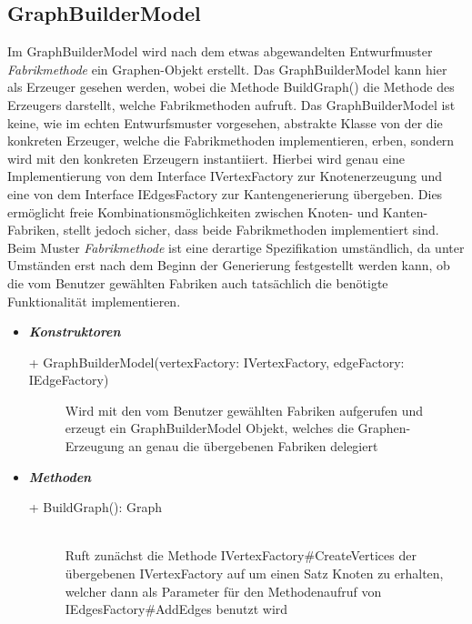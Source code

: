 \documentclass[13pt]{scrreprt}
\begin{document}
	\subsection{GraphBuilderModel}
	Im GraphBuilderModel wird nach dem etwas abgewandelten Entwurfmuster \emph{Fabrikmethode} ein Graphen-Objekt erstellt. Das GraphBuilderModel kann hier als Erzeuger gesehen werden, wobei die Methode BuildGraph() die Methode des Erzeugers darstellt, welche Fabrikmethoden aufruft. Das GraphBuilderModel ist keine, wie im echten Entwurfsmuster vorgesehen, abstrakte Klasse von der die konkreten Erzeuger, welche die Fabrikmethoden implementieren, erben, sondern wird mit den konkreten Erzeugern instantiiert. Hierbei wird genau eine Implementierung von dem Interface IVertexFactory zur Knotenerzeugung und  eine von dem Interface IEdgesFactory zur Kantengenerierung übergeben. Dies ermöglicht freie Kombinationsmöglichkeiten zwischen Knoten- und Kanten-Fabriken, stellt jedoch sicher, dass beide Fabrikmethoden implementiert sind. Beim Muster \emph{Fabrikmethode} ist eine derartige Spezifikation umständlich, da unter Umständen erst nach dem Beginn der Generierung festgestellt werden kann, ob die vom Benutzer gewählten Fabriken auch tatsächlich die benötigte Funktionalität implementieren. 
	\newpage
	\begin{itemize}[label = {$\circ$}]
		\item {\large \textbf{\textit{Konstruktoren}}\par}
		\begin{description}
			\item [+ GraphBuilderModel(vertexFactory: IVertexFactory, edgeFactory: IEdgeFactory)] Wird mit den vom Benutzer gewählten Fabriken aufgerufen und erzeugt ein GraphBuilderModel Objekt, welches die Graphen-Erzeugung an genau die übergebenen Fabriken delegiert
		\end{description}
		\item {\large \textbf{\textit{Methoden}}\par}
		\begin{description}
			\item [+ BuildGraph(): Graph] \hfill \\ Ruft zunächst die Methode IVertexFactory\#CreateVertices der übergebenen IVertexFactory auf um einen Satz Knoten zu erhalten, welcher dann als Parameter für den Methodenaufruf von IEdgesFactory\#AddEdges benutzt wird
		\end{description}
	\end{itemize}
	
\end{document}
